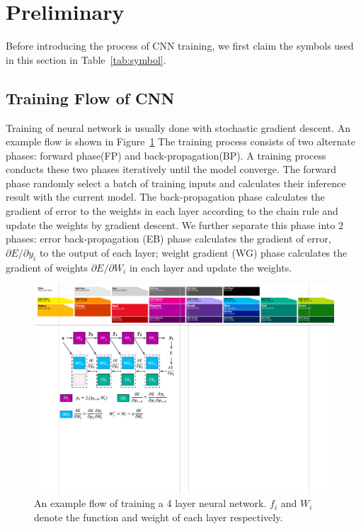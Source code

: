 \section{Preliminary}\label{sec:preliminary}
Before introducing the process of CNN training, we first claim the symbols used in this section in Table~\ref{tab:symbol}.



\subsection{Training Flow of CNN}
Training of neural network is usually done with stochastic gradient descent. An example flow is shown in Figure~\ref{fig:train_prelim} The training process consists of two alternate phases: forward phase(FP) and back-propagation(BP). A training process conducts these two phases iteratively until the model converge. The forward phase randomly select a batch of training inputs and calculates their inference result with the current model. The back-propagation phase calculates the gradient of error to the weights in each layer according to the chain rule and update the weights by gradient descent. We further separate this phase into 2 phases: error back-propagation (EB) phase calculates the gradient of error, $\partial E/\partial y_i$ to the output of each layer; weight gradient (WG) phase calculates the gradient of weights $\partial E/\partial W_i$ in each layer and update the weights. 

\begin{figure}[t]
  \centering
  \includegraphics[width=0.9\columnwidth]{figures/train_prelim.pdf}
  \caption{An example flow of training a 4 layer neural network. $f_i$ and $W_i$ denote the function and weight of each layer respectively.}
  \label{fig:train_prelim}
\end{figure}


